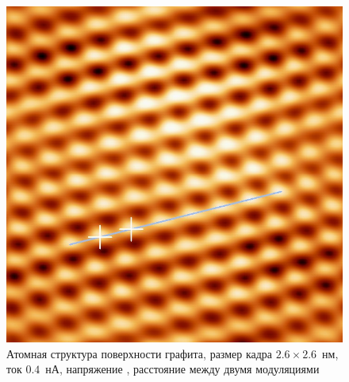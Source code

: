 \documentclass[a4paper, 12pt]{article}
\begin{document}
	\begin{figure}[H]
		\centering
		\includegraphics[width=0.7\linewidth]{../STM_data/Crystal_cell_structure/Crystal_cell}
		\caption{Атомная структура поверхности графита, размер кадра $2.6\times2.6$~нм, ток $0.4$~нА, напряжение , расстояние между двумя модуляциями }
		\label{fig:2_atomic}
	\end{figure}
	
\end{document}
